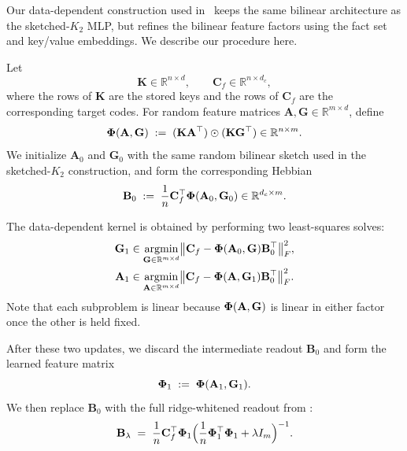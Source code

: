 Our data-dependent construction used in~ keeps the same bilinear architecture as the sketched-$K_{2}$ MLP, but refines the bilinear feature factors using the fact set and key/value embeddings. We describe our procedure here.

Let
\[
\mathbf{K}\in\mathbb{R}^{n\times d},
\qquad
\mathbf{C}_{f}\in\mathbb{R}^{n\times d_c},
\]
where the rows of $\mathbf{K}$ are the stored keys and the rows of $\mathbf{C}_{f}$ are the corresponding target codes.
For random feature matrices $\mathbf{A},\mathbf{G}\in\mathbb{R}^{m\times d}$, define
\[
{\bm{\Phi}}(\mathbf{A},\mathbf{G})\;:=\;(\mathbf{K}\mathbf{A}^\top)\odot(\mathbf{K}\mathbf{G}^\top)\in\mathbb{R}^{n\times m}.
\]
We initialize $\mathbf{A}_{0}$ and $\mathbf{G}_{0}$ with the same random bilinear sketch used in the sketched-$K_{2}$ construction, and form the corresponding Hebbian
\[
\mathbf{B}_{0} \;:=\; \frac{1}{n}\mathbf{C}_{f}^\top {\bm{\Phi}}(\mathbf{A}_{0},\mathbf{G}_{0})\in\mathbb{R}^{d_{c}\times m}.
\]

The data-dependent kernel is obtained by performing two least-squares solves:
\begin{align}
\mathbf{G}_{1}
&\in
\operatorname*{argmin}_{\mathbf{G}\in\mathbb{R}^{m\times d}}
\bigl\|
\mathbf{C}_{f}-{\bm{\Phi}}(\mathbf{A}_{0},\mathbf{G})\mathbf{B}_{0}^\top
\bigr\|_{F}^2,
\\
\mathbf{A}_{1}
&\in
\operatorname*{argmin}_{\mathbf{A}\in\mathbb{R}^{m\times d}}
\bigl\|
\mathbf{C}_{f}-{\bm{\Phi}}(\mathbf{A},\mathbf{G}_{1})\mathbf{B}_{0}^\top
\bigr\|_{F}^2.
\end{align}
Note that each subproblem is linear because ${\bm{\Phi}}(\mathbf{A},\mathbf{G})$ is linear in either factor once the other is held fixed.

After these two updates, we discard the intermediate readout $\mathbf{B}_{0}$ and form the learned feature matrix
\[
{\bm{\Phi}}_{1} \;:=\; {\bm{\Phi}}(\mathbf{A}_{1},\mathbf{G}_{1}).
\]
We then replace $\mathbf{B}_{0}$ with the full ridge-whitened readout from :
\[
\mathbf{B}_{\lambda}
\;=\;
\frac{1}{n}\mathbf{C}_{f}^\top {\bm{\Phi}}_{1}
\Bigl(\frac{1}{n}{\bm{\Phi}}_{1}^\top{\bm{\Phi}}_{1}+\lambda I_{m}\Bigr)^{-1}.
\]
